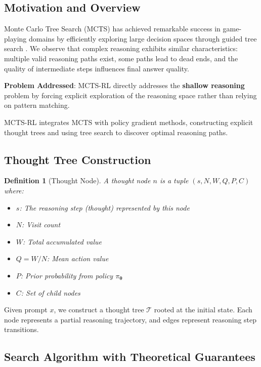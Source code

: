 \documentclass[11pt,a4paper]{article}
\newtheorem{definition}[theorem]{Definition}
\newcommand{\calT}{\mathcal{T}}
\newcommand{\btheta}{\bm{\theta}}
\begin{document}
\subsection{Motivation and Overview}

Monte Carlo Tree Search (MCTS) has achieved remarkable success in game-playing domains by efficiently exploring large decision spaces through guided tree search \citep{silver2016mastering}. We observe that complex reasoning exhibits similar characteristics: multiple valid reasoning paths exist, some paths lead to dead ends, and the quality of intermediate steps influences final answer quality.

\textbf{Problem Addressed}: MCTS-RL directly addresses the \textbf{shallow reasoning} problem by forcing explicit exploration of the reasoning space rather than relying on pattern matching.

MCTS-RL integrates MCTS with policy gradient methods, constructing explicit thought trees and using tree search to discover optimal reasoning paths.

\subsection{Thought Tree Construction}

\begin{definition}[Thought Node]
A thought node $n$ is a tuple $(s, N, W, Q, P, C)$ where:
\begin{itemize}
    \item $s$: The reasoning step (thought) represented by this node
    \item $N$: Visit count
    \item $W$: Total accumulated value
    \item $Q = W/N$: Mean action value
    \item $P$: Prior probability from policy $\pi_\btheta$
    \item $C$: Set of child nodes
\end{itemize}
\end{definition}

Given prompt $x$, we construct a thought tree $\calT$ rooted at the initial state. Each node represents a partial reasoning trajectory, and edges represent reasoning step transitions.

\subsection{Search Algorithm with Theoretical Guarantees}
\end{document}
